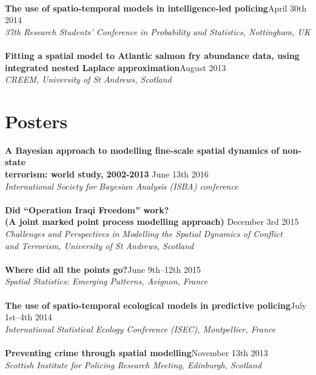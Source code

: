 \documentclass[10pt,letter]{article}
\begin{document}
 \hdashrule[0.5ex]{4cm}{1pt}{1pt}\\
{\textbf{The use of spatio-temporal models in intelligence-led policing}}\hfill  April 30th 2014\\
 {\sl 37th Research Students' Conference in Probability and Statistics, Nottingham, UK}\\
 \hdashrule[0.5ex]{4cm}{1pt}{1pt}\\
{\textbf{Fitting a spatial model to Atlantic salmon fry abundance data, using\\ integrated nested Laplace approximation}}\hfill  August 2013\\
 {\sl CREEM, University of St Andrews, Scotland}\\ 
 \vspace{-1mm}
\newpage
\section*{Posters}
\vspace{1mm}

{\textbf {A Bayesian approach to modelling fine-scale spatial dynamics of non-state\\
 terrorism: world study, 2002-2013 }}\hfill June 13th 2016\\
 {\sl International Society for Bayesian Analysis (ISBA) conference}\\
 \hdashrule[0.5ex]{4cm}{1pt}{1pt}\\
 {\textbf{Did ``Operation Iraqi Freedom'' work? \\
(A joint marked point process modelling approach) }}\hfill December 3rd 2015\\
 {\sl Challenges and Perspectives in Modelling the Spatial Dynamics of Conflict\\ and Terrorism, University of St Andrews, Scotland}\\
 \hdashrule[0.5ex]{4cm}{1pt}{1pt}\\
{\textbf{Where did all the points go?}}\hfill June 9th--12th 2015\\
 {\sl Spatial Statistics: Emerging Patterns, Avignon, France}\\
\hdashrule[0.5ex]{4cm}{1pt}{1pt}\\
 {\textbf{The use of spatio-temporal ecological models in predictive policing}}\hfill July 1st--4th 2014\\
 {\sl International Statistical Ecology Conference (ISEC), Montpellier, France}\\
 \hdashrule[0.5ex]{4cm}{1pt}{1pt}\\
{\textbf{Preventing crime through spatial modelling}}\hfill November 13th 2013\\
 {\sl Scottish Institute for Policing Research Meeting, Edinburgh, Scotland}\\
\end{document}
